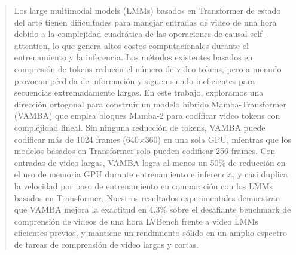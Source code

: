 \begin{abstract}
Los large multimodal models (LMMs) basados en Transformer de estado del arte tienen dificultades para manejar entradas de video de una hora debido a la complejidad cuadrática de las operaciones de causal self-attention, lo que genera altos costos computacionales durante el entrenamiento y la inferencia. Los métodos existentes basados en compresión de tokens reducen el número de video tokens, pero a menudo provocan pérdida de información y siguen siendo ineficientes para secuencias extremadamente largas. En este trabajo, exploramos una dirección ortogonal para construir un modelo híbrido Mamba-Transformer (VAMBA) que emplea bloques Mamba-2 para codificar video tokens con complejidad lineal. Sin ninguna reducción de tokens, VAMBA puede codificar más de 1024 frames (640$\times$360) en una sola GPU, mientras que los modelos basados en Transformer solo pueden codificar 256 frames. Con entradas de video largas, VAMBA logra al menos un 50\% de reducción en el uso de memoria GPU durante entrenamiento e inferencia, y casi duplica la velocidad por paso de entrenamiento en comparación con los LMMs basados en Transformer. Nuestros resultados experimentales demuestran que VAMBA mejora la exactitud en 4.3\% sobre el desafiante benchmark de comprensión de videos de una hora LVBench frente a video LMMs eficientes previos, y mantiene un rendimiento sólido en un amplio espectro de tareas de comprensión de video largas y cortas.


\end{abstract}
